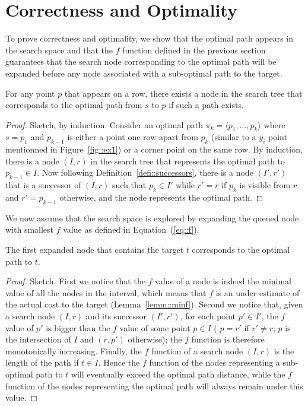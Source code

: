 \section{Correctness and Optimality}

To prove correctness and optimality, 
we show that the optimal path 
appears in the search space 
and that the $f$ function defined in the previous section 
guarantees that the search node 
corresponding to the optimal path 
will be expanded before any node 
associated with a sub-optimal path to the target.  

\begin{theorem}
  For any point $p$ that appears on a row, 
  there exists a node in the search tree 
  that corresponds to the optimal path from $s$ to $p$ 
  if such a path exists.  
\end{theorem}

\begin{proof}
  Sketch, by induction.  
  Consider an optimal path 
  $\pi_k = \langle p_1,\dots,p_k\rangle$ 
  where $s = p_1$ and $p_{k-1}$ is either a point 
  one row apart from $p_k$ (similar to a $y_i$ point
  mentionned in Figure~\ref{fig::ex1}) or a corner point on the same row.  
  By induction, there is a node $(I,r)$ in the search tree 
  that represents the optimal path to $p_{k-1} \in I$.  
  Now following Definition~\ref{defi::successors}, 
  there is a node $(I',r')$ 
  that is a successor of $(I,r)$ 
  such that $p_k \in I'$ while $r' = r$ if $p_k$ is visible from $r$ 
  and $r' = p_{k-1}$ otherwise, and the node represents the optimal path.  
\end{proof}

We now assume that the search space is explored 
by expanding the queued node with smallest $f$ value 
as defined in Equation~(\ref{eq::f}).  

\begin{theorem}
  The first expanded node 
  that contains the target $t$ 
  corresponds to the optimal path to $t$.  
\end{theorem}

\begin{proof}
  Sketch.  
  First we notice that the $f$ value of a node 
  is indeed the minimal value of all the nodes in the interval, 
  which means that $f$ is an under estimate of the actual cost 
  to the target (Lemma~\ref{lemm::minf}).  
  Second we notice that, given a search node $(I,r)$ 
  and its successor $(I',r')$, 
  for each point $p' \in I'$, 
  the $f$ value of $p'$ is bigger 
  than the $f$ value of some point $p \in I$ 
  (%
  $p = r'$ if $r' \neq r$; 
  $p$ is the intersection of $I$ and $(r,p')$ otherwise); 
  the $f$ function is therefore monotonically increasing.  
  Finally, the $f$ function of a search node $(I,r)$ 
  is the length of the path if $t \in I$.  
  Hence the $f$ function of the nodes representing 
  a sub-optimal path to $t$ 
  will eventually exceed the optimal path distance, 
  while the $f$ function of the nodes representing the optimal path 
  will always remain under this value.  
\end{proof}

